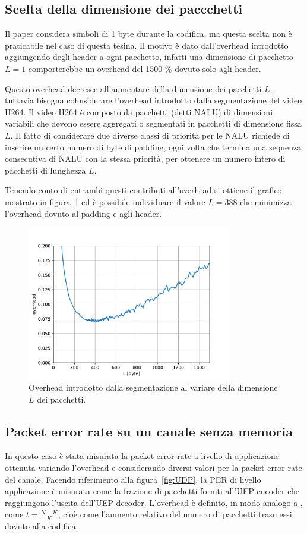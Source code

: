 \documentclass[italian, a4paper, 12pt]{article}
\begin{document}
\subsection{Scelta della dimensione dei paccchetti}
Il paper \cite{uep} considera simboli di 1 byte durante la codifica,
ma questa scelta non è praticabile nel caso di questa tesina. Il
motivo è dato dall'overhead introdotto aggiungendo degli header a ogni
pacchetto, infatti una dimensione di pacchetto $L=1$ comporterebbe un
overhead del 1500 \% dovuto solo agli header.

Questo overhead decresce all'aumentare della dimensione dei pacchetti
$L$, tuttavia bisogna cohnsiderare l'overhead introdotto dalla
segmentazione del video H264.
%
Il video H264 è composto da pacchetti (detti NALU) di dimensioni
variabili che devono essere aggregati o segmentati in pacchetti di
dimensione fissa $L$. Il fatto di considerare due diverse classi di
priorità per le NALU richiede di inserire un certo numero di byte di
padding, ogni volta che termina una sequenza consecutiva di NALU con
la stessa priorità, per ottenere un numero intero di pacchetti di
lunghezza $L$.

Tenendo conto di entrambi questi contributi all'overhead si ottiene il
grafico mostrato in figura~\ref{fig:pktsize} ed è possibile
individuare il valore $L = 388$ che minimizza l'overhead dovuto al
padding e agli header.
\begin{figure}[H]
  \centering
  \includegraphics[width=0.8\textwidth]{plot_overhead}
  \caption{Overhead introdotto dalla segmentazione al variare della
    dimensione $L$ dei pacchetti.}
  \label{fig:pktsize}
\end{figure}

\subsection{Packet error rate su un canale senza memoria}
In questo caso è stata misurata la packet error rate a livello di
applicazione ottenuta variando l'overhead e considerando diversi
valori per la packet error rate del canale.
%
Facendo riferimento alla figura~\ref{fig:UDP}, la PER di livello
applicazione è misurata come la frazione di pacchetti forniti all'UEP
encoder che raggiungono l'uscita dell'UEP decoder.
%
L'overhead è definito, in modo analogo a \cite{uep}, come $t =
\frac{N-K}{K}$, cioè come l'aumento relativo del numero di pacchetti
trasmessi dovuto alla codifica.
\end{document}
